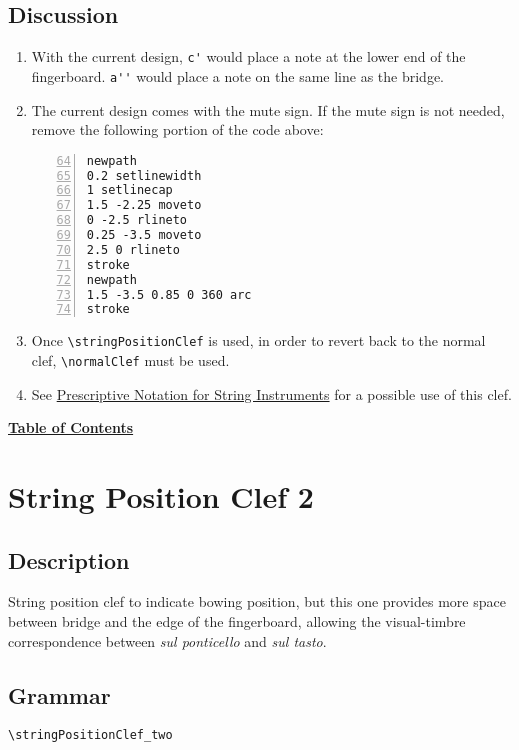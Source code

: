 \subsection{Discussion}
\begin{enumerate}
\item With the current design, \verb|c'| would place a note at the lower end of the fingerboard. \verb|a''| would place a note on the same line as the bridge. 

\item The current design comes with the mute sign. If the mute sign is not needed, remove the following portion of the code above:

\begin{Verbatim}[numbers=left,xleftmargin=5mm,firstnumber=64]
%mutesign
newpath
0.2 setlinewidth
1 setlinecap
1.5 -2.25 moveto
0 -2.5 rlineto
0.25 -3.5 moveto
2.5 0 rlineto
stroke
newpath
1.5 -3.5 0.85 0 360 arc
stroke
\end{Verbatim}

\item Once \verb|\stringPositionClef| is used, in order to revert back to the normal clef, \verb|\normalClef| must be used.
\item See \hyperref[sec:comb_strings]{Prescriptive Notation for String Instruments} for a possible use of this clef.
\end{enumerate}

\hyperref[sec:toc]{\textbf{Table of Contents}}

\vfill \break


\section {String Position Clef 2}
\hfill
{}
\hfill

\subsection{Description}
String position clef to indicate bowing position, but this one provides more space between bridge and the edge of the fingerboard, allowing the visual-timbre correspondence between \textit{sul ponticello} and \textit{sul tasto}. 

\subsection{Grammar}
\begin{verbatim}
\stringPositionClef_two
\end{verbatim}
